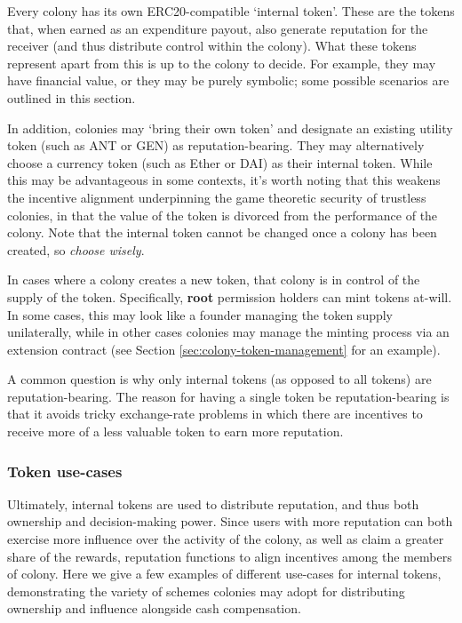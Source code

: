 Every colony has its own ERC20-compatible `internal token'. These are the tokens that, when earned as an expenditure payout, also generate reputation for the receiver (and thus distribute control within the colony). What these tokens represent apart from this is up to the colony to decide. For example, they may have financial value, or they may be purely symbolic; some possible scenarios are outlined in this section.

In addition, colonies may `bring their own token' and designate an existing utility token (such as ANT or GEN) as reputation-bearing. They may alternatively choose a currency token (such as Ether or DAI) as their internal token. While this may be advantageous in some contexts, it’s worth noting that this weakens the incentive alignment underpinning the game theoretic security of trustless colonies, in that the value of the token is divorced from the performance of the colony. Note that the internal token cannot be changed once a colony has been created, so \textit{choose wisely}.

In cases where a colony creates a new token, that colony is in control of the supply of the token. Specifically, \textbf{root} permission holders can mint tokens at-will. In some cases, this may look like a founder managing the token supply unilaterally, while in other cases colonies may manage the minting process via an extension contract (see Section \ref{sec:colony-token-management} for an example).

A common question is why only internal tokens (as opposed to all tokens) are reputation-bearing. The reason for having a single token be reputation-bearing is that it avoids tricky exchange-rate problems in which there are incentives to receive more of a less valuable token to earn more reputation.

\subsubsection{Token use-cases}

Ultimately, internal tokens are used to distribute reputation, and thus both ownership and decision-making power. Since users with more reputation can both exercise more influence over the activity of the colony, as well as claim a greater share of the rewards, reputation functions to align incentives among the members of colony. Here we give a few examples of different use-cases for internal tokens, demonstrating the variety of schemes colonies may adopt for distributing ownership and influence alongside cash compensation.

